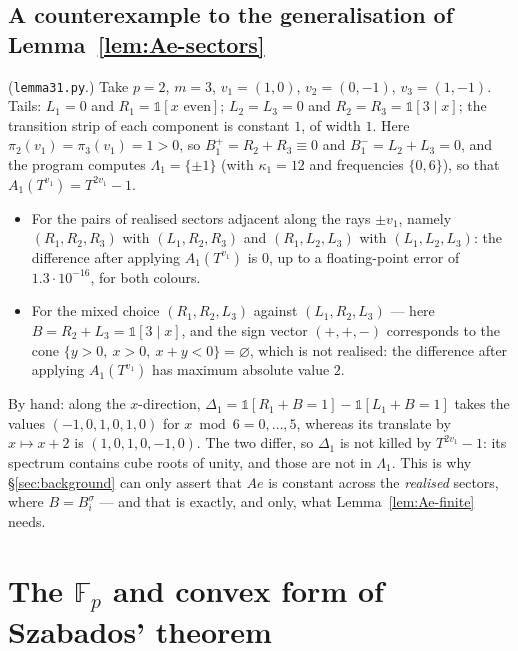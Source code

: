 \documentclass[11pt,reqno]{amsart}
\theoremstyle{plain}
\theoremstyle{definition}
\theoremstyle{remark}
\theoremstyle{plain}
\theoremstyle{remark}
\theoremstyle{definition}
\numberwithin{equation}{section}
\newcommand{\Fp}{\mathbb{F}_p}
\newcommand{\one}{\mathbb{1}}
\begin{document}
\subsection{A counterexample to the generalisation of
Lemma~\ref{lem:Ae-sectors}}\label{app:counterexample}

(\texttt{lemma31.py}.)  Take $p=2$, $m=3$, $v_1=(1,0)$, $v_2=(0,-1)$,
$v_3=(1,-1)$.  Tails: $L_1=0$ and $R_1=\one[x\text{ even}]$; $L_2=L_3=0$ and
$R_2=R_3=\one[3\mid x]$; the transition strip of each component is constant
$1$, of width $1$.  Here $\pi_2(v_1)=\pi_3(v_1)=1>0$, so
$B_1^+=R_2+R_3\equiv0$ and $B_1^-=L_2+L_3=0$, and the program computes
$\Lambda_1=\{\pm1\}$ (with $\kappa_1=12$ and frequencies $\{0,6\}$), so that
$A_1(T^{v_1})=T^{2v_1}-1$.

\begin{itemize}
\item For the pairs of realised sectors adjacent along the rays $\pm v_1$,
namely $(R_1,R_2,R_3)$ with $(L_1,R_2,R_3)$ and $(R_1,L_2,L_3)$ with
$(L_1,L_2,L_3)$: the difference after applying $A_1(T^{v_1})$ is $0$, up to a
floating-point error of $1.3\cdot10^{-16}$, for both colours.

\item For the mixed choice $(R_1,R_2,L_3)$ against $(L_1,R_2,L_3)$ — here
$B=R_2+L_3=\one[3\mid x]$, and the sign vector $(+,+,-)$ corresponds to the cone
$\{y>0,\ x>0,\ x+y<0\}=\varnothing$, which is not realised: the difference after
applying $A_1(T^{v_1})$ has maximum absolute value $2$.
\end{itemize}

By hand: along the $x$-direction,
$\Delta_1=\one[R_1+B=1]-\one[L_1+B=1]$ takes the values $(-1,0,1,0,1,0)$ for
$x\bmod6=0,\dots,5$, whereas its translate by $x\mapsto x+2$ is
$(1,0,1,0,-1,0)$.  The two differ, so $\Delta_1$ is not killed by
$T^{2v_1}-1$: its spectrum contains cube roots of unity, and those are not in
$\Lambda_1$.  This is why \S\ref{sec:background} can only assert that $Ae$ is
constant across the \emph{realised} sectors, where $B=B_i^\sigma$ — and that is
exactly, and only, what Lemma~\ref{lem:Ae-finite} needs.

\section{The \texorpdfstring{$\Fp$}{Fp} and convex form of Szabados'
theorem}\label{app:szabados}
\end{document}
